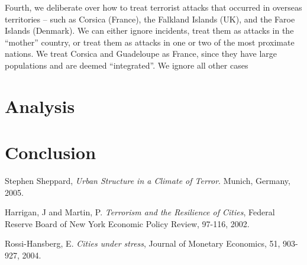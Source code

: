 \documentclass[preprint,2p,12pt]{elsarticle}
\begin{document}
Fourth, we deliberate over how to treat terrorist attacks that occurred in overseas territories -- such as Corsica (France), the Falkland Islands (UK), and the Faroe Islands (Denmark).
We can either ignore incidents, treat them as attacks in the ``mother'' country, or treat them as attacks in one or two of the most proximate nations.
We treat Corsica and Guadeloupe as France, since they have large populations and are deemed ``integrated''. We ignore all other cases
\section{Analysis}


\section{Conclusion}


\begin{thebibliography}{9}

  Stephen Sheppard,
  \emph{Urban Structure in a Climate of Terror}.
  Munich, Germany,
  2005.

  Harrigan, J and Martin, P.
  \emph{Terrorism and the Resilience of Cities},
  Federal Reserve Board of New York Economic Policy Review,
  97-116,
  2002.

  Rossi-Hansberg, E.
  \emph{Cities under stress},
  Journal of Monetary Economics,
  51, 903-927,
  2004.

\end{thebibliography}
\end{document}
